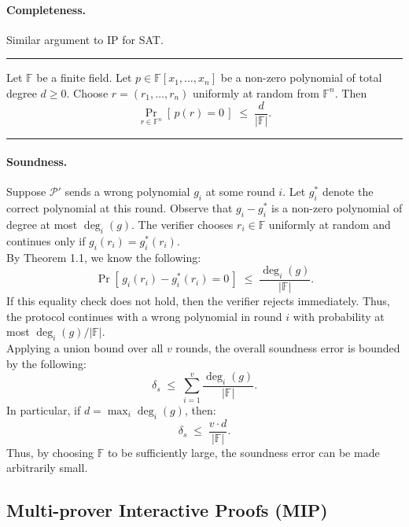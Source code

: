 \myspace
\myspace

\newpage

\paragraph{Completeness.}
Similar argument to IP for SAT.

\myspace
\myspace
\hrule

\begin{theorem}
Let $\mathbb{F}$ be a finite field. Let $p \in \mathbb{F}[x_1,\dots,x_n]$ be a non-zero polynomial
of total degree $d \ge 0$. Choose $r=(r_1,\dots,r_n)$ uniformly at random from $\mathbb{F}^n$.
Then
\[
\Pr_{r\in \mathbb{F}^n}[\,p(r)=0\,] \;\le\; \frac{d}{|\mathbb{F}|}.
\]
\end{theorem}

\hrule
\myspace

\paragraph{Soundness.}
Suppose \(\mathcal{P}'\) sends a wrong polynomial \(g_i\) at some round \(i\). Let $g^*_i$ denote the correct polynomial at this round. Observe that $g_i - g^*_i$ is a non-zero polynomial of degree at most $\deg_i(g)$. The verifier chooses $r_i \in \mathbb{F}$ uniformly at random and continues only if $g_i(r_i) = g^*_i(r_i)$. \\

\noindent By Theorem 1.1, we know the following:
\[
\Pr[\,g_i(r_i) - g^*_i(r_i) =0\,] \;\le\; \frac{\deg_i(g)}{|\mathbb{F}|}.
\]
If this equality check does not hold, then the verifier rejects immediately. Thus, the protocol continues with a wrong polynomial in round $i$ with probability at most $\deg_i(g)/|\mathbb{F}|$. \\

\noindent Applying a union bound over all $v$ rounds, the overall soundness error is bounded by the following:
\[
\delta_{s} \;\le\; \sum_{i=1}^v \frac{\deg_i(g)}{|\mathbb{F}|}.
\]
In particular, if $d=\max_i \deg_i(g)$, then:
\[
\delta_{s} \;\le\; \frac{v \cdot d}{|\mathbb{F}|}.
\]
Thus, by choosing $\mathbb{F}$ to be sufficiently large, the soundness error can be made arbitrarily small. \\


\subsection{Multi-prover Interactive Proofs (MIP)}

